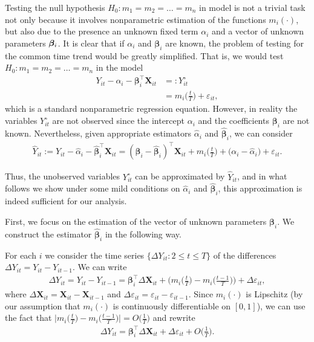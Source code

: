 \documentclass[a4paper,12pt]{article}
\makeatletter
\renewcommand{\eqref}[1]{\tagform@{\ref{#1}}}
\makeatother
\begin{document}
Testing the null hypothesis $H_0: m_1 = m_2 = \ldots = m_n$ in model \eqref{eq:model_full} is not a trivial task not only because it involves nonparametric estimation of the functions $m_i(\cdot)$, but also due to the presence an unknown fixed term $\alpha_i$ and a vector of unknown parameters $\bm{\beta}_i$. It is clear that if $\alpha_i$ and $\bm{\beta}_i$ are known, the problem of testing for the common time trend would be greatly simplified. That is, we would test $H_0: m_1 = m_2 = \ldots = m_n$ in the model
\begin{align*}
Y_{it} - \alpha_i - \bm{\beta}_i^\top \mathbf{X}_{it} & =: Y_{it}^\circ\\
					& = m_i \Big( \frac{t}{T} \Big) + \varepsilon_{it}, 
\end{align*}
which is a standard nonparametric regression equation. However, in reality the variables $Y_{it}^\circ$ are not observed since the intercept $\alpha_i$ and the coefficients $\bm{\beta}_i$ are not known. Nevertheless, given appropriate estimators $\widehat{\alpha}_i$ and $\widehat{\bm{\beta}}_i$, we can consider
\begin{align*}
	\widehat{Y}_{it} := Y_{it} -\widehat{\alpha}_i - \widehat{\bm{\beta}}_i^\top \mathbf{X}_{it} =(\bm{\beta}_i - \widehat{\bm{\beta}}_i)^\top \mathbf{X}_{it} + m_i \Big( \frac{t}{T} \Big) + \big( \alpha_i - \widehat{\alpha}_i \big) + \varepsilon_{it}. 
\end{align*}

Thus, the unobserved variables $Y_{it}^\circ$ can be approximated by $\widehat{Y}_{it}$, and in what follows we show under some mild conditions on $\widehat{\alpha}_i$ and $\widehat{\bm{\beta}}_i$, this approximation is indeed sufficient for our analysis. 

First, we focus on the estimation of the vector of unknown parameters $\bm{\beta}_i$. We construct the estimator  $\widehat{\bm{\beta}}_i$ in the following way.

For each $i$ we consider the time series $\{\Delta Y_{it}: 2 \leq t \leq T\}$ of the differences \linebreak $\Delta Y_{it} = Y_{it} - Y_{i t-1}$. We can write
\begin{align*}
	\Delta Y_{it} = Y_{it} - Y_{i t-1} =\bm{\beta}_i^\top \Delta \mathbf{X}_{it} + \bigg(m_i \Big( \frac{t}{T} \Big) - m_i \Big(\frac{t-1}{T}\Big)\bigg) + \Delta \varepsilon_{it},
\end{align*}
where $\Delta  \mathbf{X}_{it} =  \mathbf{X}_{it} -  \mathbf{X}_{it-1}$ and $ \Delta \varepsilon_{it} = \varepsilon_{it} - \varepsilon_{i t-1}$. Since $m_i(\cdot)$ is Lipschitz (by our assumption that $m_i(\cdot)$ is continuously differentiable on $[0, 1]$), we can use the fact that $ \big|m_i \big( \frac{t}{T} \big) - m_i \big(\frac{t-1}{T}\big) \big| = O\big(\frac{1}{T}\big)$ and rewrite 
\begin{align}\label{model_with_regs}
	\Delta Y_{it} = \bm{\beta}_i^\top \Delta \mathbf{X}_{it} + \Delta \varepsilon_{it} + O\Big(\frac{1}{T}\Big).
\end{align}
\end{document}
